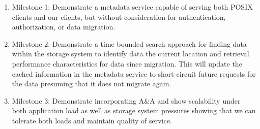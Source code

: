 \begin{enumerate}

\item Milestone 1: Demonstrate a metadata service capable of serving both POSIX
clients and our clients, but without consideration for authentication, authorization, or data migration.

\item Milestone 2: Demonstrate a time bounded search approach for finding data
within the storage system to identify data the current location and retrieval
performance characteristics for data since migration. This will update the
cached information in the metadata service to short-circuit future requests for
the data presuming that it does not migrate again.

\item Milestone 3: Demonstrate incorporating A\&A and show scalability under
both application load as well as storage system pressures showing that we can
tolerate both loads and maintain quality of service.

\end{enumerate}

